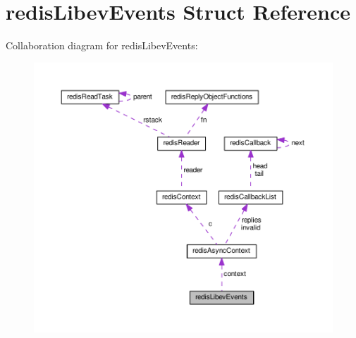 \hypertarget{structredis_libev_events}{\section{redis\+Libev\+Events Struct Reference}
\label{structredis_libev_events}
}


Collaboration diagram for redis\+Libev\+Events\+:\nopagebreak
\begin{figure}[H]
\begin{center}
\leavevmode
\includegraphics[width=350pt]{structredis_libev_events__coll__graph}
\end{center}
\end{figure}
